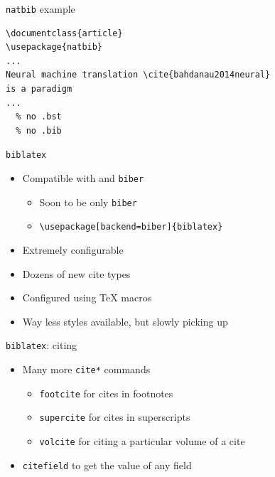 \documentclass[english]{beamer}
\let\olditem\item
\renewcommand{\item}{\setlength{\itemsep}{\fill}\olditem}
\newenvironment{sitemize}{\let\item\olditem \begin{itemize}}{\vfill\end{itemize}}
\let\textttt\texttt
\renewcommand{\texttt}[1]{\colorbox{gray!10}{\textttt{#1}}}
\begin{document}
\begin{frame}[fragile]{\texttt{natbib} example}
\begin{verbatim}
\documentclass{article}
\usepackage{natbib}
...
Neural machine translation \cite{bahdanau2014neural} 
is a paradigm
...
  % no .bst
  % no .bib
\end{verbatim}

\end{frame}

\begin{frame}[fragile]{\texttt{biblatex}}
    \begin{itemize}
        \item Compatible with  and \texttt{biber}
        \begin{sitemize}
            \item Soon to be only \texttt{biber}
            \item \verb|\usepackage[backend=biber]{biblatex}|
        \end{sitemize}
        \item Extremely configurable 
        \item Dozens of new cite types
        \item Configured using \TeX{} macros
        \item Way less styles available, but slowly picking up
    \end{itemize}
\end{frame}

\begin{frame}{\texttt{biblatex}: citing}
    \begin{itemize}
        \item Many more \texttt{cite*} commands
        \begin{sitemize}
            \item[\texttt{footcite}] for cites in footnotes
            \item[\texttt{supercite}] for cites in superscripts
            \item[\texttt{volcite}] for citing a particular volume of a cite
        \end{sitemize}
        \item \texttt{citefield} to get the value of any field
    \end{itemize}
\end{frame}
\end{document}
